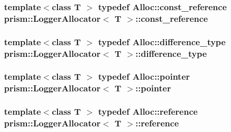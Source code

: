 \subsubsection[{\texorpdfstring{const\+\_\+reference}{const_reference}}]{\setlength{\rightskip}{0pt plus 5cm}template$<$class T $>$ typedef {\bf Alloc\+::const\+\_\+reference} {\bf prism\+::\+Logger\+Allocator}$<$ T $>$\+::{\bf const\+\_\+reference}}\hypertarget{classprism_1_1_logger_allocator_a43e29d3baf22667bcebda8345fb5b101}{}\label{classprism_1_1_logger_allocator_a43e29d3baf22667bcebda8345fb5b101}
\subsubsection[{\texorpdfstring{difference\+\_\+type}{difference_type}}]{\setlength{\rightskip}{0pt plus 5cm}template$<$class T $>$ typedef {\bf Alloc\+::difference\+\_\+type} {\bf prism\+::\+Logger\+Allocator}$<$ T $>$\+::{\bf difference\+\_\+type}}\hypertarget{classprism_1_1_logger_allocator_ad9285548751a3bd2d51fbf39d2b33f2a}{}\label{classprism_1_1_logger_allocator_ad9285548751a3bd2d51fbf39d2b33f2a}
\subsubsection[{\texorpdfstring{pointer}{pointer}}]{\setlength{\rightskip}{0pt plus 5cm}template$<$class T $>$ typedef {\bf Alloc\+::pointer} {\bf prism\+::\+Logger\+Allocator}$<$ T $>$\+::{\bf pointer}}\hypertarget{classprism_1_1_logger_allocator_aa39096d64ef616bad095b6439bcb1bbe}{}\label{classprism_1_1_logger_allocator_aa39096d64ef616bad095b6439bcb1bbe}
\subsubsection[{\texorpdfstring{reference}{reference}}]{\setlength{\rightskip}{0pt plus 5cm}template$<$class T $>$ typedef {\bf Alloc\+::reference} {\bf prism\+::\+Logger\+Allocator}$<$ T $>$\+::{\bf reference}}\hypertarget{classprism_1_1_logger_allocator_a7b3d035e8bae517d30ec47fee59cc450}{}\label{classprism_1_1_logger_allocator_a7b3d035e8bae517d30ec47fee59cc450}
